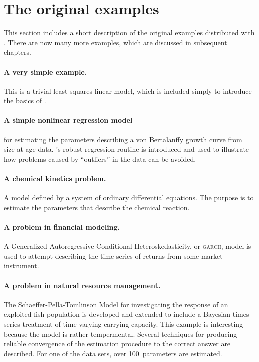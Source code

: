 \documentclass{admbmanual}
\begin{document}
\section{The original \ADMS examples}

This section includes a short description of the original
examples distributed with \ADM. There are now many more examples,
which are discussed in subsequent chapters.


\paragraph{A very simple example.} This is a trivial least-squares
linear model, which is included simply to introduce the basics of 
\ADM.

\paragraph{A simple nonlinear regression model} for estimating the parameters
describing a von Bertalanffy growth curve from size-at-age data.
\ADM's robust regression routine is introduced and used to illustrate
how problems caused by ``outliers'' in the data can be avoided. 

\paragraph{A chemical kinetics problem.}  A model defined by a
system of ordinary differential equations. The purpose is to
estimate the parameters that describe the chemical reaction.  

\paragraph{A problem in financial modeling.} A Generalized Autoregressive 
Conditional Hetero\-ske\-dast\-icity, or \textsc{garch}, model  is used
to attempt describing the time series of returns from some
market instrument.

\paragraph{A problem in natural resource management.} The 
Schaeffer-Pella-Tomlinson Model
for investigating the response of an exploited fish population
is developed and extended to include
a Bayesian times series treatment of time-varying carrying 
capacity.  This example is interesting because the model
is rather tempermental.  Several techniques for
producing reliable convergence of the estimation procedure to
the correct answer are described. For one of the data sets, over 
100~parameters are estimated.  
\end{document}
